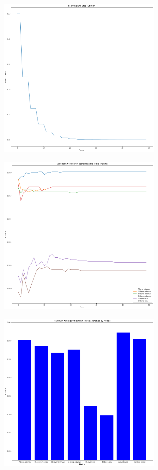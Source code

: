 \documentclass[a4paper,11pt]{article}
\begin{document}
\begin{figure}[H]
\centering
\includegraphics[width=8cm]{Step_function}
\caption{}
\label{fig-4}
\end{figure}
\begin{figure}[H]
\centering
\includegraphics[width=8cm]{Training}
\caption{}
\label{fig-5}
\end{figure}
\begin{figure}[H]
\centering
\includegraphics[width=8cm]{Accuracy}
\caption{}
\label{fig-6}
\end{figure}
\end{document}
